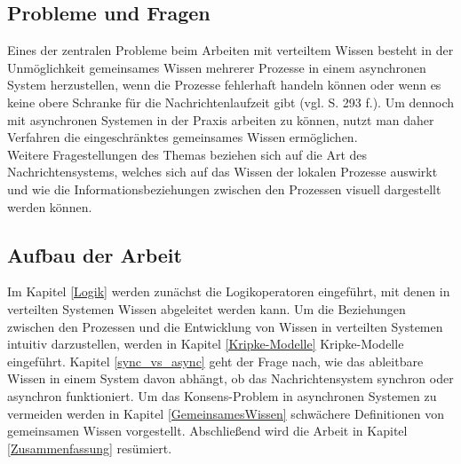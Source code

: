 \subsection{Probleme und Fragen}
Eines der zentralen Probleme beim Arbeiten mit verteiltem Wissen besteht in der Unmöglichkeit gemeinsames Wissen mehrerer Prozesse in einem asynchronen System herzustellen, wenn die Prozesse fehlerhaft handeln können oder wenn es keine obere Schranke für die Nachrichtenlaufzeit gibt (vgl.\cite{kshemkalyani2011distributed} S. 293 f.).
Um dennoch mit asynchronen Systemen in der Praxis arbeiten zu können, nutzt man daher Verfahren die eingeschränktes gemeinsames Wissen ermöglichen.\\
Weitere Fragestellungen des Themas beziehen sich auf die Art des Nachrichtensystems, welches sich auf das Wissen der lokalen Prozesse auswirkt und wie die Informationsbeziehungen zwischen den Prozessen visuell dargestellt werden können.

\subsection{Aufbau der Arbeit}
Im Kapitel \ref{Logik} werden zunächst die Logikoperatoren eingeführt, mit denen in verteilten Systemen Wissen abgeleitet werden kann.
Um die Beziehungen zwischen den Prozessen und die Entwicklung von Wissen in verteilten Systemen intuitiv darzustellen, werden in Kapitel \ref{Kripke-Modelle} Kripke-Modelle eingeführt. Kapitel \ref{sync_vs_async} geht der Frage nach, wie das ableitbare Wissen in einem System davon abhängt, ob das Nachrichtensystem synchron oder asynchron funktioniert. Um das Konsens-Problem in asynchronen Systemen zu vermeiden werden in Kapitel \ref{GemeinsamesWissen} schwächere Definitionen von gemeinsamen Wissen vorgestellt.
Abschließend wird die Arbeit in Kapitel \ref{Zusammenfassung} resümiert.